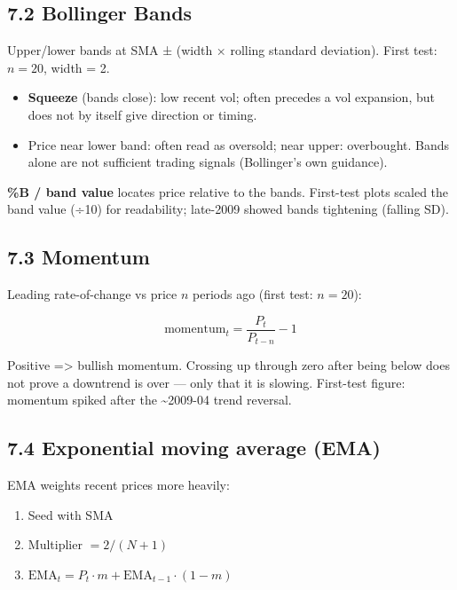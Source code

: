 \documentclass[
  11pt,
]{article}
\providecommand{\tightlist}{%
  \setlength{\itemsep}{0pt}\setlength{\parskip}{0pt}}
\begin{document}
\subsection{7.2 Bollinger Bands}\label{bollinger-bands}

Upper/lower bands at SMA ± (width × rolling standard deviation). First
test: \(n = 20\), width = 2.

\begin{itemize}
\tightlist
\item
  \textbf{Squeeze} (bands close): low recent vol; often precedes a vol
  expansion, but does not by itself give direction or timing.\\
\item
  Price near lower band: often read as oversold; near upper: overbought.
  Bands alone are not sufficient trading signals (Bollinger's own
  guidance).
\end{itemize}

\textbf{\%B / band value} locates price relative to the bands.
First-test plots scaled the band value (÷10) for readability; late-2009
showed bands tightening (falling SD).

\subsection{7.3 Momentum}\label{momentum}

Leading rate-of-change vs price \(n\) periods ago (first test:
\(n = 20\)):

\[
\text{momentum}_t = \frac{P_t}{P_{t-n}} - 1
\]

Positive =\textgreater{} bullish momentum. Crossing up through zero
after being below does not prove a downtrend is over --- only that it is
slowing. First-test figure: momentum spiked after the
\textasciitilde2009-04 trend reversal.

\subsection{7.4 Exponential moving average
(EMA)}\label{exponential-moving-average-ema}

EMA weights recent prices more heavily:

\begin{enumerate}
\def\labelenumi{\arabic{enumi}.}
\tightlist
\item
  Seed with SMA\\
\item
  Multiplier \(= 2/(N+1)\)\\
\item
  \(\mathrm{EMA}_t = P_t \cdot m + \mathrm{EMA}_{t-1}\cdot(1-m)\)
\end{enumerate}
\end{document}
